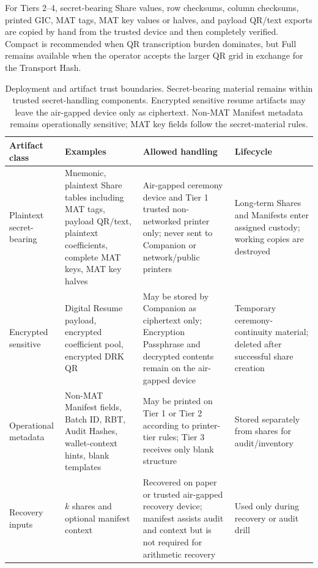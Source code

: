 \documentclass[11pt]{article}
\begin{document}
For Tiers 2--4, secret-bearing Share values, row checksums, column checksums, printed GIC, MAT tags, MAT key values or halves, and payload QR/text exports are copied by hand from the trusted device and then completely verified. Compact is recommended when QR transcription burden dominates, but Full remains available when the operator accepts the larger QR grid in exchange for the Transport Hash.

\begin{table}[H]
\centering
\small
\setlength{\tabcolsep}{4pt}
\begin{tabular}{@{}>{\raggedright\arraybackslash}p{}>{\raggedright\arraybackslash}p{}>{\raggedright\arraybackslash}p{}>{\raggedright\arraybackslash}p{}@{}}
\toprule
\textbf{Artifact class} & \textbf{Examples} & \textbf{Allowed handling} & \textbf{Lifecycle} \\ \midrule
Plaintext secret-bearing &
Mnemonic, plaintext Share tables including MAT tags, payload QR/text, plaintext coefficients, complete MAT keys, MAT key halves &
Air-gapped ceremony device and Tier 1 trusted non-networked printer only; never sent to Companion or network/public printers &
Long-term Shares and Manifests enter assigned custody; working copies are destroyed \\ \addlinespace
Encrypted sensitive &
Digital Resume payload, encrypted coefficient pool, encrypted DRK QR &
May be stored by Companion as ciphertext only; Encryption Passphrase and decrypted contents remain on the air-gapped device &
Temporary ceremony-continuity material; deleted after successful share creation \\ \addlinespace
Operational metadata &
Non-MAT Manifest fields, Batch ID, RBT, Audit Hashes, wallet-context hints, blank templates &
May be printed on Tier 1 or Tier 2 according to printer-tier rules; Tier 3 receives only blank structure &
Stored separately from shares for audit/inventory \\ \addlinespace
Recovery inputs &
$k$ shares and optional manifest context &
Recovered on paper or trusted air-gapped recovery device; manifest assists audit and context but is not required for arithmetic recovery &
Used only during recovery or audit drill \\ \bottomrule
\end{tabular}
\caption{Deployment and artifact trust boundaries. Secret-bearing material remains within trusted secret-handling components. Encrypted sensitive resume artifacts may leave the air-gapped device only as ciphertext. Non-MAT Manifest metadata remains operationally sensitive; MAT key fields follow the secret-material rules.}
\label{tab:trust-boundaries}
\end{table}
\end{document}
